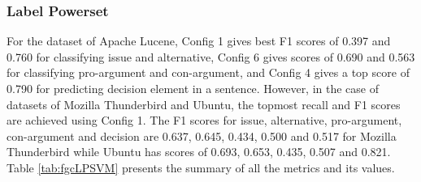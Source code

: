 \documentclass[a4paper,12pt,twoside]{report}
\begin{document}
\subsubsection{Label Powerset}
For the dataset of Apache Lucene, Config 1 gives best F1 scores of 0.397 and 0.760 for classifying issue and alternative, Config 6 gives scores of 0.690 and 0.563 for classifying pro-argument and con-argument, and Config 4 gives a top score of 0.790 for predicting decision element in a sentence. However, in the case of datasets of Mozilla Thunderbird and Ubuntu, the topmost recall and F1 scores are achieved using Config 1. The F1 scores for issue, alternative, pro-argument, con-argument and decision are 0.637, 0.645, 0.434, 0.500 and 0.517 for Mozilla Thunderbird while Ubuntu has scores of 0.693, 0.653, 0.435, 0.507 and 0.821. Table \ref{tab:fgcLPSVM} presents the summary of all the metrics and its values.
\end{document}
